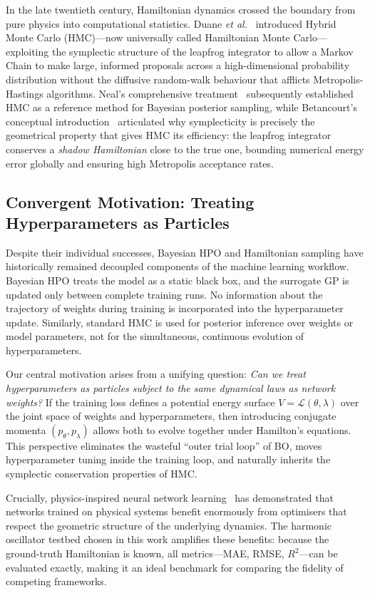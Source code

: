 \documentclass[11pt]{article}
\begin{document}
In the late twentieth century, Hamiltonian dynamics crossed the
boundary from pure physics into computational statistics.  Duane
\emph{et al.}~\cite{duane1987} introduced Hybrid Monte Carlo (HMC)—now
universally called Hamiltonian Monte Carlo—exploiting the symplectic
structure of the leapfrog integrator to allow a Markov Chain to make
large, informed proposals across a high-dimensional probability
distribution without the diffusive random-walk behaviour that afflicts
Metropolis-Hastings algorithms.  Neal's comprehensive
treatment~\cite{neal2011} subsequently established HMC as a reference
method for Bayesian posterior sampling, while Betancourt's conceptual
introduction~\cite{betancourt2017} articulated why symplecticity is
precisely the geometrical property that gives HMC its efficiency: the
leapfrog integrator conserves a \emph{shadow Hamiltonian} close to the
true one, bounding numerical energy error globally and ensuring high
Metropolis acceptance rates.

\subsection{Convergent Motivation: Treating Hyperparameters as Particles}

Despite their individual successes, Bayesian HPO and Hamiltonian
sampling have historically remained decoupled components of the machine
learning workflow.  Bayesian HPO treats the model as a static black
box, and the surrogate GP is updated only between complete training
runs.  No information about the trajectory of weights during training
is incorporated into the hyperparameter update.  Similarly, standard
HMC is used for posterior inference over weights or model parameters,
not for the simultaneous, continuous evolution of hyperparameters.

Our central motivation arises from a unifying question: \emph{Can we
treat hyperparameters as particles subject to the same dynamical laws as
network weights?}  If the training loss defines a potential energy
surface $V = \mathcal{L}(\theta, \lambda)$ over the joint space of
weights and hyperparameters, then introducing conjugate momenta
$(p_\theta, p_\lambda)$ allows both to evolve together under Hamilton's
equations.  This perspective eliminates the wasteful ``outer trial
loop'' of BO, moves hyperparameter tuning inside the training loop, and
naturally inherits the symplectic conservation properties of HMC.

Crucially, physics-inspired neural network learning~\cite{greydanus2019,zhang2025}
has demonstrated that networks trained on physical systems benefit
enormously from optimisers that respect the geometric structure of the
underlying dynamics.  The harmonic oscillator testbed chosen in this
work amplifies these benefits: because the ground-truth Hamiltonian is
known, all metrics—MAE, RMSE, $R^2$—can be evaluated exactly, making it
an ideal benchmark for comparing the fidelity of competing frameworks.
\end{document}
